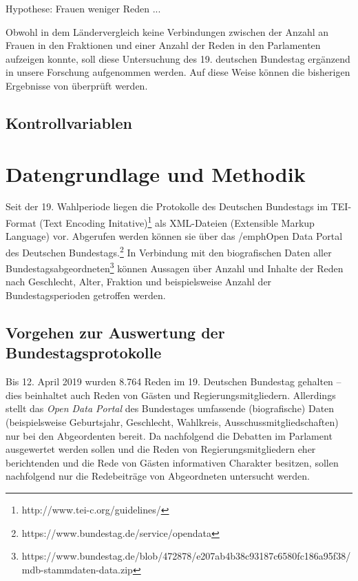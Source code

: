 \documentclass[12pt, 
    twoside=false, 
    bibliography=totoc, 
    numbers=endperiod, 
    headings=normal, 
    toc=chapterentrydotfill
    ]{scrbook}
\begin{document}
Hypothese: Frauen weniger Reden ... 

Obwohl \textcite{back_2018} in dem Ländervergleich keine Verbindungen zwischen der Anzahl an Frauen in den Fraktionen und einer Anzahl der Reden in den Parlamenten aufzeigen konnte, soll diese Untersuchung des 19. deutschen Bundestag ergänzend in unsere Forschung aufgenommen werden. Auf diese Weise können die bisherigen Ergebnisse von \textcite{back_2018} überprüft werden.

\section{Kontrollvariablen}

\chapter{Datengrundlage und Methodik}

Seit der 19. Wahlperiode liegen die Protokolle des Deutschen Bundestags im TEI-Format (Text Encoding Initative)\footnote{http://www.tei-c.org/guidelines/} als XML-Dateien (Extensible Markup Language) vor. Abgerufen werden können sie über das /emph{Open Data Portal} des Deutschen Bundestags.\footnote{https://www.bundestag.de/service/opendata} In Verbindung mit den biografischen Daten aller Bundestagsabgeordneten\footnote{https://www.bundestag.de/blob/472878/e207ab4b38c93187c6580fc186a95f38/mdb-stammdaten-data.zip} können Aussagen über Anzahl und Inhalte der Reden nach Geschlecht, Alter, Fraktion und beispielsweise Anzahl der Bundestagsperioden getroffen werden.

\section{Vorgehen zur Auswertung der Bundestagsprotokolle}

Bis 12. April 2019 wurden 8.764 Reden im 19. Deutschen Bundestag gehalten -- dies beinhaltet auch Reden von Gästen und Regierungsmitgliedern. Allerdings stellt das \emph{Open Data Portal} des Bundestages umfassende (biografische) Daten (beispielsweise Geburtsjahr, Geschlecht, Wahlkreis, Ausschussmitgliedschaften) nur bei den Abgeordenten bereit. Da nachfolgend die Debatten im Parlament ausgewertet werden sollen und die Reden von Regierungsmitgliedern eher berichtenden und die Rede von Gästen informativen Charakter besitzen, sollen nachfolgend nur die Redebeiträge von Abgeordneten untersucht werden.
\end{document}
